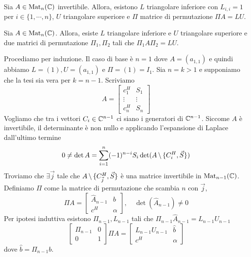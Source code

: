 \documentclass[a4paper]{article}
\begin{document}
\begin{snippettheorem}{}
    Sia \(A \in \operatorname{Mat}_n(\mathbb{C})\) invertibile.
    Allora, esistono \(L\) triangolare inferiore con \(L_{i,i} = 1\) per \(i \in \{1, \cdots, n\}\),
    \(U\) triangolare superiore e \(\Pi\) matrice di permutazione \(\Pi A = LU\).
\end{snippettheorem}

\begin{snippettheorem}{}
    Sia \(A \in \operatorname{Mat}_n(\mathbb{C})\).
    Allora, esiste \(L\) triangolare inferiore e \(U\) triangolare superiore
    e due matrici di permutazione \(\Pi_1, \Pi_2\) tali che \(\Pi_1 A \Pi_2 = LU\).
\end{snippettheorem}

\begin{snippetproof}{}
    Procediamo per induzione.
    Il caso di base è \(n=1\) dove \(A = (a_{1,1})\) e quindi abbiamo
    \(L=(1), U=(a_{1,1})\) e \(\Pi = (1) = I_1\).
    Sia \(n=k>1\) e supponiamo che la tesi sia vera per \(k = n-1\).
    Scriviamo \[
        A = \left[
            \begin{array}{c|c}
                c_1^H & S_1 \\
                \hline
                \vdots & \vdots \\
                \hline
                c_n^H & S_n
            \end{array}
        \right]
    \]
    Vogliamo che tra i vettori \(C_i \in \mathbb{C}^{n-1}\) ci siano i generatori di \(\mathbb{C}^{n-1}\).
    Siccome \(A\) è invertibile, il determinante è non nullo e applicando l'espansione di Laplace
    dall'ultimo termine
    \[
        0 \neq \det A = \sum_{i=1}^n (-1)^{n-i} S_i \det(A \,\backslash\, \{C_i^H, \vec S\})
    \]
    Troviamo che \(\exists \vec j\) tale che \(A \,\backslash\, \{C_{\vec j}^H, \vec S\}\) è una matrice invertibile in \(\operatorname{Mat}_{n-1}(\mathbb{C})\).
    Definiamo \(\Pi\) come la matrice di permutazione che scambia \(n\) con \(\vec j\),
    \[
        \Pi A = \left[
            \begin{array}{c|c}
                \hat A_{n-1} & b \\
                \hline
                c^H & \alpha
            \end{array}
        \right], \quad \det(\hat A_{n-1}) \neq 0
    \]
    Per ipotesi induttiva esistono \(\Pi_{n-1}, L_{n-1}\)
    tali che \(\Pi_{n-1} \hat A_{n-1} = L_{n-1}U_{n-1}\)
    \[
        \left[
            \begin{array}{c|c}
                \Pi_{n-1} & 0 \\
                \hline
                0 & 1
            \end{array}
        \right] \Pi A = \left[
            \begin{array}{c|c}
                L_{n-1}U_{n-1} & \hat b \\
                \hline
                c^H & \alpha
            \end{array}
        \right]
    \]
    dove \(\hat b = \Pi_{n-1}b\).
\end{snippetproof}
\end{document}
